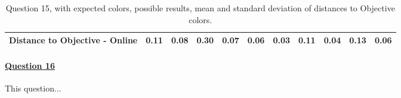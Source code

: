\begin{table}[H]
{\begin{tabular}{lccccccccccccc}
    \multicolumn{4}{l}{Distance to Objective - Online}                                                                                               & \multicolumn{1}{|c}{0.11}        & \multicolumn{1}{c|}{0.08}    & \multicolumn{1}{|c}{0.30}        & \multicolumn{1}{c|}{0.07}    & \multicolumn{1}{|c}{\textbf{0.06}}       & \multicolumn{1}{c|}{0.03}    & \multicolumn{1}{|c}{0.11}        & \multicolumn{1}{c|}{0.04}    & \multicolumn{1}{|c}{0.13}       & \multicolumn{1}{c|}{0.06}    \\ \hline
    \end{tabular}}
  \caption[Question 15, with expected Results.]{Question 15, with expected colors, possible results, mean and standard deviation of distances to Objective colors.}
  \label{table:lab_q15_expected}
\end{table}
%
\paragraph{\ul{Question 16}}
%
This question...
%
